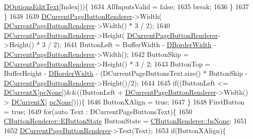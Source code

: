 \begin{DoxyCode}
      \hyperlink{classCApplicationData_a7044dc34cbd9d6776e8ef79eb12b5ce4}{DOptionsEditText}[Index]))\{
1634             AllInputsValid = \textcolor{keyword}{false};
1635             \textcolor{keywordflow}{break};
1636         \}
1637     \}
1638     
1639     \hyperlink{classCApplicationData_abfe1743f2634b069ccc811db4a8733a8}{DCurrentPageButtonRenderer}->Width(
      \hyperlink{classCApplicationData_abfe1743f2634b069ccc811db4a8733a8}{DCurrentPageButtonRenderer}->Width() * 3 / 2);
1640     \hyperlink{classCApplicationData_abfe1743f2634b069ccc811db4a8733a8}{DCurrentPageButtonRenderer}->Height(
      \hyperlink{classCApplicationData_abfe1743f2634b069ccc811db4a8733a8}{DCurrentPageButtonRenderer}->Height() * 3 / 2);                            
1641     ButtonLeft = BufferWidth - \hyperlink{classCApplicationData_a566b69c72fa982c6ecf8e47dc21df489}{DBorderWidth} - 
      \hyperlink{classCApplicationData_abfe1743f2634b069ccc811db4a8733a8}{DCurrentPageButtonRenderer}->Width();
1642     ButtonSkip = \hyperlink{classCApplicationData_abfe1743f2634b069ccc811db4a8733a8}{DCurrentPageButtonRenderer}->Height() * 3 / 2;
1643     ButtonTop = BufferHeight - \hyperlink{classCApplicationData_a566b69c72fa982c6ecf8e47dc21df489}{DBorderWidth} - (DCurrentPageButtonsText.size() * ButtonSkip - 
      \hyperlink{classCApplicationData_abfe1743f2634b069ccc811db4a8733a8}{DCurrentPageButtonRenderer}->Height()/2);
1644     
1645     \textcolor{keywordflow}{if}((ButtonLeft <= \hyperlink{classCApplicationData_a1dc7ee482a39f7978c71365ac540f97a}{DCurrentX}[\hyperlink{GameDataTypes_8h_aafb0ca75933357ff28a6d7efbdd7602fa88767aa8e02c7b3192bbab4127b3d729}{pcNone}])&&((ButtonLeft + 
      \hyperlink{classCApplicationData_abfe1743f2634b069ccc811db4a8733a8}{DCurrentPageButtonRenderer}->Width() > \hyperlink{classCApplicationData_a1dc7ee482a39f7978c71365ac540f97a}{DCurrentX}[
      \hyperlink{GameDataTypes_8h_aafb0ca75933357ff28a6d7efbdd7602fa88767aa8e02c7b3192bbab4127b3d729}{pcNone}])))\{
1646         ButtonXAlign = \textcolor{keyword}{true};       
1647     \}
1648     FirstButton = \textcolor{keyword}{true};
1649     \textcolor{keywordflow}{for}(\textcolor{keyword}{auto} Text : DCurrentPageButtonsText)\{
1650         \hyperlink{classCButtonRenderer_ae0eccda184600f6e14bfd59033e5e9a1}{CButtonRenderer::EButtonState} ButtonState = 
      \hyperlink{classCButtonRenderer_ae0eccda184600f6e14bfd59033e5e9a1aa0cd7277705307bef6c50f2250b5d62d}{CButtonRenderer::bsNone};
1651         
1652         \hyperlink{classCApplicationData_abfe1743f2634b069ccc811db4a8733a8}{DCurrentPageButtonRenderer}->Text(Text);
1653         \textcolor{keywordflow}{if}(ButtonXAlign)\{

\end{DoxyCode}
